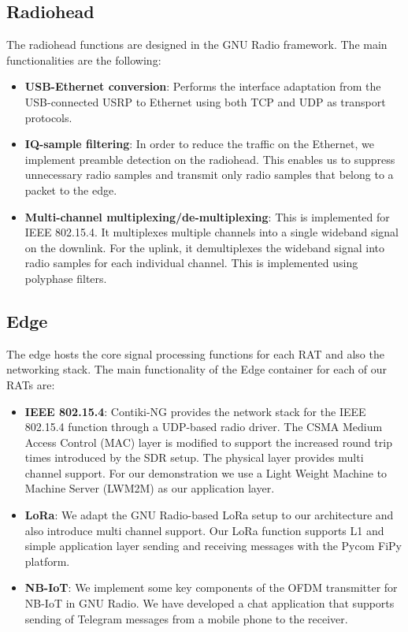\documentclass[10pt,emptycopyrightspace]{ewsn-proc}
\begin{document}
\subsection{Radiohead}
The radiohead functions are designed in the GNU Radio framework. The main functionalities are the following:
\begin{itemize}
	\item \textbf{USB-Ethernet conversion}: Performs the interface adaptation from the USB-connected USRP to Ethernet using both TCP and UDP as transport protocols.
	
	\item \textbf{IQ-sample filtering}: In order to reduce the traffic on the Ethernet, we implement preamble detection on the radiohead. This enables us to suppress unnecessary radio samples and transmit only radio samples that belong to a packet to the edge. 
	
	\item \textbf{Multi-channel multiplexing/de-multiplexing}: This is implemented for IEEE 802.15.4. It multiplexes multiple channels into a single wideband signal on the downlink. For the uplink, it demultiplexes the wideband signal into radio samples for each individual channel. This is implemented using polyphase filters.
	
\end{itemize}
\subsection{Edge}
The edge hosts the core signal processing functions for each RAT and also the networking stack. The main functionality of the Edge container for each of our RATs are:
\begin{itemize}
	\item \textbf{IEEE 802.15.4}: Contiki-NG provides the network stack for the IEEE 802.15.4 function through a UDP-based radio driver. The CSMA Medium Access Control (MAC) layer is modified to support the increased round trip times introduced by the SDR setup. The physical layer provides multi channel support. For our demonstration we use a Light Weight Machine to Machine Server (LWM2M) as our application layer. 		
	\item \textbf{LoRa}: We adapt the GNU Radio-based LoRa setup to our architecture and also introduce multi channel support. Our LoRa function supports L1 and simple application layer sending and receiving messages with the Pycom FiPy platform.
	

	\item \textbf{NB-IoT}: We implement some key components of the OFDM transmitter for NB-IoT in GNU Radio. We have developed a chat application that supports sending of Telegram messages from a mobile phone to the receiver.
\end{itemize}
\end{document}
